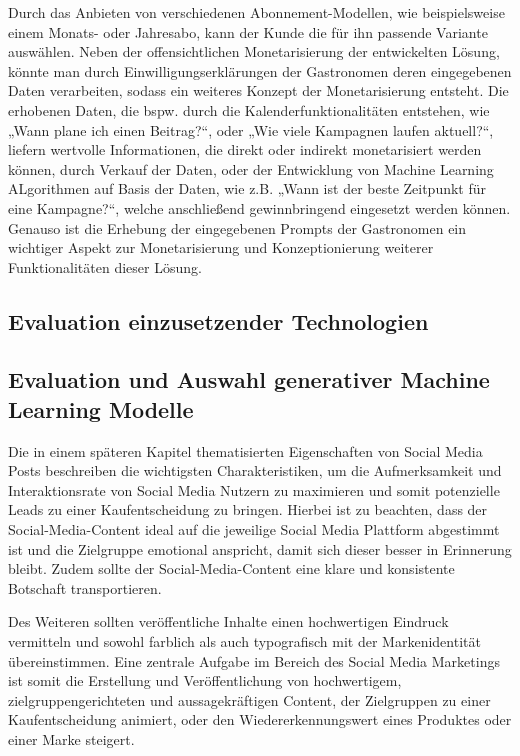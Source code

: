 Durch das Anbieten von verschiedenen Abonnement-Modellen, wie beispielsweise einem Monats- oder Jahresabo, kann der Kunde die für ihn passende Variante auswählen.
Neben der offensichtlichen Monetarisierung der entwickelten Lösung, könnte man durch Einwilligungserklärungen der Gastronomen deren eingegebenen Daten verarbeiten, sodass ein weiteres Konzept der Monetarisierung entsteht.
Die erhobenen Daten, die bspw. durch die Kalenderfunktionalitäten entstehen, wie „Wann plane ich einen Beitrag?“, oder „Wie viele Kampagnen laufen aktuell?“, liefern wertvolle Informationen, die direkt oder indirekt monetarisiert werden können, durch Verkauf der Daten, oder der Entwicklung von Machine Learning ALgorithmen auf Basis der Daten, wie z.B. „Wann ist der beste Zeitpunkt für eine Kampagne?“, welche anschließend gewinnbringend eingesetzt werden können.
Genauso ist die Erhebung der eingegebenen Prompts der Gastronomen ein wichtiger Aspekt zur Monetarisierung und Konzeptionierung weiterer Funktionalitäten dieser Lösung.

\subsection{Evaluation einzusetzender Technologien}

\subsection{Evaluation und Auswahl generativer Machine Learning Modelle} %
Die in einem späteren Kapitel thematisierten Eigenschaften von Social Media Posts beschreiben die wichtigsten Charakteristiken, um die Aufmerksamkeit und Interaktionsrate von Social Media Nutzern zu maximieren und somit potenzielle Leads zu einer Kaufentscheidung zu bringen.
Hierbei ist zu beachten, dass der Social-Media-Content ideal auf die jeweilige Social Media Plattform abgestimmt ist und die Zielgruppe emotional anspricht, damit sich dieser besser in Erinnerung bleibt.
Zudem sollte der Social-Media-Content eine klare und konsistente Botschaft transportieren.

Des Weiteren sollten veröffentliche Inhalte einen hochwertigen Eindruck vermitteln und sowohl farblich als auch typografisch mit der Markenidentität übereinstimmen.
Eine zentrale Aufgabe im Bereich des Social Media Marketings ist somit die Erstellung und Veröffentlichung von hochwertigem, zielgruppengerichteten und aussagekräftigen Content, der Zielgruppen zu einer Kaufentscheidung animiert, oder den Wiedererkennungswert eines Produktes oder einer Marke steigert.

